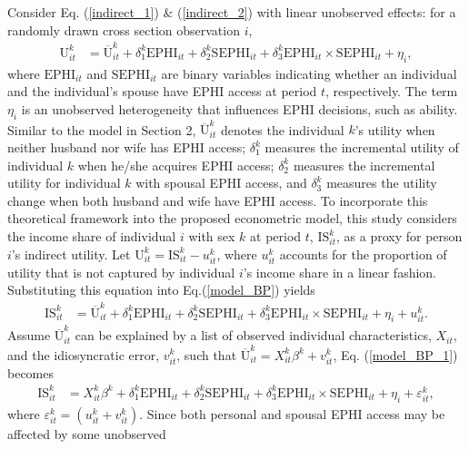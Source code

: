 \documentclass[legno,11pt]{article}
\begin{document}
Consider Eq. (\ref{indirect_1}) \&
(\ref{indirect_2}) with linear unobserved effects: for a
randomly drawn cross section observation $i$,
\begin{align}
\text{U}^{k}_{it}&=
\overline{\text{U}}^{k}_{it}+\delta_{1}^{k}\text{EPHI}_{it}+\delta_{2}^{k}\text{SEPHI}_{it}
+\delta_{3}^{k}\text{EPHI}_{it}\times\text{SEPHI}_{it}+\eta_{i}\label{model_BP},
\end{align}
where $\text{EPHI}_{it}$ and $\text{SEPHI}_{it}$ are binary
variables indicating whether an individual and the individual's
spouse have EPHI access at period $t$, respectively. The term
$\eta_{i}$ is an unobserved heterogeneity that influences EPHI
decisions, such as ability. Similar to the model in Section 2,
$\overline{\text{U}}^{k}_{it}$ denotes the individual $k$'s utility
when neither husband nor wife has EPHI access; $\delta^{k}_{1}$
measures the incremental utility of individual $k$ when he/she
acquires EPHI access; $\delta^{k}_{2}$ measures the incremental
utility for individual $k$ with spousal EPHI access, and
$\delta^{k}_{3}$ measures the utility change when both husband and
wife have EPHI access. To incorporate this theoretical framework
into the proposed econometric model, this study considers the income
share of individual $i$ with sex $k$ at period $t$,
$\text{IS}^{k}_{it}$, as a proxy for person $i$'s indirect utility.
Let $\text{U}^{k}_{it}=\text{IS}^{k}_{it}-u_{it}^{k}$, where
$u^{k}_{it}$ accounts for the proportion of utility that is not
captured by individual $i$'s income share in a linear fashion.
Substituting this equation into Eq.(\ref{model_BP}) yields
\begin{align}
\text{IS}^{k}_{it}&=
\overline{\text{U}}^{k}_{it}+\delta_{1}^{k}\text{EPHI}_{it}+\delta_{2}^{k}\text{SEPHI}_{it}
+\delta_{3}^{k}\text{EPHI}_{it}\times\text{SEPHI}_{it}+\eta_{i}+u_{it}^{k}.\label{model_BP_1}
\end{align}
Assume $\overline{\text{U}}^{k}_{it} $ can be explained by a list of
observed individual characteristics, $X_{it}$, and the idiosyncratic
error, $v_{it}^{k}$, such that
$\overline{\text{U}}^{k}_{it}=X^{k}_{it}\beta^{k}+v_{it}^{k}$,
Eq. (\ref{model_BP_1}) becomes
\begin{align}
  \text{IS}_{it}^{k}&=X^{k}_{it}\beta^{k}+\delta_{1}^{k}\text{EPHI}_{it}+\delta_{2}^{k}\text{SEPHI}_{it}
+\delta_{3}^{k}\text{EPHI}_{it}\times\text{SEPHI}_{it}+\eta_{i}+\varepsilon_{it}^{k},\label{model_13}
\end{align}
where $\varepsilon_{it}^{k}=(u_{it}^{k}+v_{it}^{k})$. Since both
personal and spousal EPHI access may be affected by some unobserved
\end{document}
